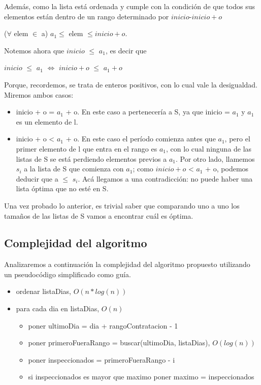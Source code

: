 Adem\'as, como la lista est\'a ordenada y cumple con la condici\'on de que todos sus elementos est\'an dentro de un rango determinado por $inicio$-$inicio + o$\\
\begin{center}
($\forall$ elem $\in$ a) $a_1 \leq$ elem $\leq inicio + o$.\\
\end{center}

Notemos ahora que $inicio$ $\leq$ $a_1$, es decir que \\ 
\begin{center}
$inicio$ $\leq$ $a_1$ $\Leftrightarrow$ $inicio + o$ $\leq$ $a_1 + o$
\end{center}
Porque, recordemos, se trata de enteros positivos, con lo cual vale la desigualdad.\\

Miremos ambos casos:
\begin{itemize}
\item inicio + o = $a_1$ + o. En este caso a pertenecer\'ia a S, ya que inicio = $a_1$ y $a_1$ es un elemento de l.
\item inicio + o < $a_1$ + o. En este caso el per\'iodo comienza antes que $a_1$, pero el primer elemento de l que entra en el rango es $a_1$, con lo cual ninguna de las listas de S se est\'a perdiendo elementos previos a $a_1$. Por otro lado, llamemos $s_i$ a la lista de S que comienza con $a_1$; como $inicio + o$ < $a_1$ + o, podemos deducir que a $\leq$ $ s_i$. Ac\'a llegamos a una contradicci\'on: no puede haber una lista \'optima que no est\'e en S.
\end{itemize}

Una vez probado lo anterior, es trivial saber que comparando uno a uno los tama\~nos de las listas de S vamos a encontrar cu\'al es \'optima.\\

\subsection{Complejidad del algoritmo}

Analizaremos a continuaci\'on la complejidad del algoritmo propuesto utilizando un pseudoc\'odigo simplificado como gu\'ia.

\begin{itemize}
\item ordenar listaDias, $O(n*log(n))$
\item para cada dia en listaDias, $O(n)$
\begin{itemize}
	\item poner ultimoDia = dia + rangoContratacion - 1
	\item poner primeroFueraRango = buscar(ultimoDia, listaDias), $O(log(n))$
	\item poner inspeccionados = primeroFueraRango - i
	\item si inspeccionados es mayor que maximo poner maximo = inspeccionados
\end{itemize}
\end{itemize}

